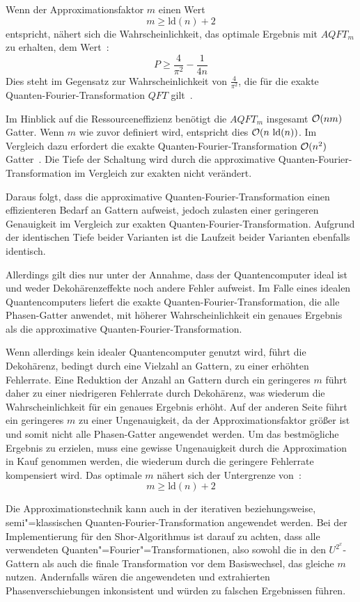 Wenn der Approximationsfaktor \(m\) einen Wert
\[m \geq \text{ld}(n)+2\]
entspricht, nähert sich die Wahrscheinlichkeit, das optimale Ergebnis mit \(AQFT_m\)
zu erhalten, dem Wert~\cite{cheung2004improved}: 
\[P \geq \frac{4}{\pi^2} - \frac{1}{4n}\]
Dies steht im Gegensatz zur Wahrscheinlichkeit von \(\frac{4}{\pi^2}\), 
die für die exakte Quanten-Fourier-Transformation \(QFT\) gilt~\cite{cheung2004improved}\cite[119]{kaye2007introduction}.

Im Hinblick auf die Ressourceneffizienz benötigt die \(AQFT_m\) insgesamt \(\operatorname{\mathcal{O}}(nm)\) Gatter.
Wenn \(m\) wie zuvor definiert wird, entspricht dies \(\operatorname{\mathcal{O}}(n~\text{ld}(n))\). 
Im Vergleich dazu erfordert die exakte Quanten-Fourier-Transformation \(\operatorname{\mathcal{O}}(n^2)\) Gatter~\cite{Barenco_1996}.
Die Tiefe der Schaltung wird durch die approximative Quanten-Fourier-Transformation im Vergleich zur exakten nicht verändert.

Daraus folgt, dass die approximative Quanten-Fourier-Transformation einen effizienteren Bedarf an Gattern aufweist, 
jedoch zulasten einer geringeren Genauigkeit im Vergleich zur exakten Quanten-Fourier-Transformation.
Aufgrund der identischen Tiefe beider Varianten ist die Laufzeit beider Varianten ebenfalls identisch.

Allerdings gilt dies nur unter der Annahme, 
dass der Quantencomputer ideal ist und weder Dekohärenzeffekte noch andere Fehler aufweist.
Im Falle eines idealen Quantencomputers liefert die exakte Quanten-Fourier-Transformation, die alle Phasen-Gatter anwendet, 
mit höherer Wahrscheinlichkeit ein genaues Ergebnis als die approximative Quanten-Fourier-Transformation.

Wenn allerdings kein idealer Quantencomputer genutzt wird, 
führt die Dekohärenz, 
bedingt durch eine Vielzahl an Gattern, 
zu einer erhöhten Fehlerrate.
Eine Reduktion der Anzahl an Gattern durch ein geringeres 
\(m\) führt daher zu einer niedrigeren Fehlerrate durch Dekohärenz, 
was wiederum die Wahrscheinlichkeit für ein genaues Ergebnis erhöht.
Auf der anderen Seite führt ein geringeres \(m\) zu einer Ungenauigkeit,
da der Approximationsfaktor größer ist und somit nicht alle Phasen-Gatter angewendet werden.
Um das bestmögliche Ergebnis zu erzielen, 
muss eine gewisse Ungenauigkeit durch die Approximation in Kauf genommen werden, 
die wiederum durch die geringere Fehlerrate kompensiert wird. 
Das optimale \(m\) nähert sich der Untergrenze von~\cite{Barenco_1996}:
\[m \geq \text{ld}(n)+2\]

Die Approximationstechnik kann auch in der iterativen beziehungsweise, 
semi"=klassisch\-en Quanten-Fourier-Transformation angewendet werden. 
Bei der Implementierung für den Shor-Algorithmus ist darauf zu achten, 
dass alle verwendeten Quanten"=Fourier"=Transformationen, also sowohl die in den \(U^{2^x}\)-Gattern als auch die finale Transformation vor dem Basiswechsel, 
das gleiche \(m\) nutzen.
Andernfalls wären die angewendeten und extrahierten Phasenverschiebungen inkonsistent 
und würden zu falschen Ergebnissen führen.

